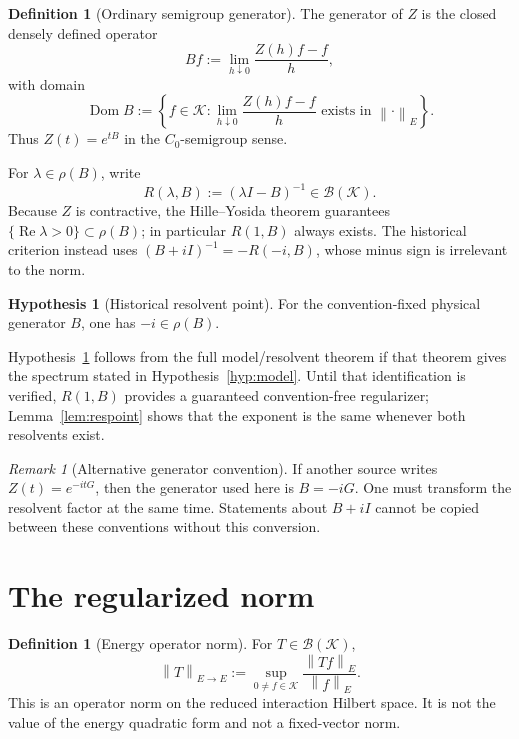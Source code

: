 \documentclass[11pt]{amsart}
\theoremstyle{definition}
\newtheorem{definition}[theorem]{Definition}
\newtheorem{hypothesis}[theorem]{Hypothesis}
\theoremstyle{remark}
\newtheorem{remark}[theorem]{Remark}
\DeclareMathOperator{\Dom}{Dom}
\DeclareMathOperator{\Repart}{Re}
\newcommand{\Bcal}{\mathcal B}
\newcommand{\Kcal}{\mathcal K}
\newcommand{\norm}[1]{\left\lVert #1\right\rVert}
\begin{document}
\begin{definition}[Ordinary semigroup generator]
The generator of $Z$ is the closed densely defined operator
\[
 Bf:=\lim_{h\downarrow0}\frac{Z(h)f-f}{h},
 \]
with domain
\[
 \Dom B:=\left\{f\in\Kcal:
 \lim_{h\downarrow0}\frac{Z(h)f-f}{h}
 \text{ exists in }\norm{\cdot}_{E}\right\}.
\]
Thus $Z(t)=e^{tB}$ in the $C_{0}$-semigroup sense.
\end{definition}

For $\lambda\in\rho(B)$, write
\[
 R(\lambda,B):=(\lambda I-B)^{-1}\in\Bcal(\Kcal).
\]
Because $Z$ is contractive, the Hille--Yosida theorem guarantees
$\{\Repart\lambda>0\}\subset\rho(B)$; in particular $R(1,B)$ always exists.
The historical criterion instead uses
$(B+iI)^{-1}=-R(-i,B)$, whose minus sign is irrelevant to the norm.

\begin{hypothesis}[Historical resolvent point]\label{hyp:minus-i}
For the convention-fixed physical generator $B$, one has $-i\in\rho(B)$.
\end{hypothesis}

Hypothesis~\ref{hyp:minus-i} follows from the full model/resolvent theorem if
that theorem gives the spectrum stated in Hypothesis~\ref{hyp:model}.  Until
that identification is verified, $R(1,B)$ provides a guaranteed
convention-free regularizer; Lemma~\ref{lem:respoint} shows that the exponent
is the same whenever both resolvents exist.

\begin{remark}[Alternative generator convention]
If another source writes $Z(t)=e^{-itG}$, then the generator used here is
$B=-iG$.  One must transform the resolvent factor at the same time.  Statements
about $B+iI$ cannot be copied between these conventions without this
conversion.
\end{remark}

\section{The regularized norm}\label{sec:regularized}

\begin{definition}[Energy operator norm]
For $T\in\Bcal(\Kcal)$,
\[
 \norm{T}_{E\to E}
 :=\sup_{0\neq f\in\Kcal}
   \frac{\norm{Tf}_{E}}{\norm{f}_{E}}.
\]
This is an operator norm on the reduced interaction Hilbert space.  It is not
the value of the energy quadratic form and not a fixed-vector norm.
\end{definition}
\end{document}
